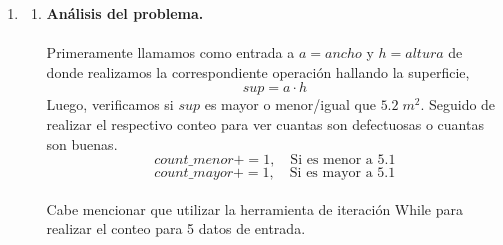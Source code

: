 \begin{enumerate}

\item 
\begin{enumerate}[\bfseries a)]
    
    \item \textbf{Análisis del problema.}\\\\
	Primeramente llamamos como entrada a $a=ancho$  y $h=altura$ de donde realizamos la correspondiente operación hallando la superficie,
	$$sup = a\cdot h$$
	Luego, verificamos si $sup$ es mayor o menor/igual que $5.2\; m^2$. Seguido de  realizar el respectivo conteo para ver cuantas son defectuosas o cuantas son buenas. 
	$$count\_menor += 1, \quad \mbox{Si es menor a 5.1}$$
	$$count\_mayor += 1, \quad \mbox{Si es mayor a 5.1}$$\\
	Cabe mencionar que utilizar la herramienta de iteración While para realizar el conteo para 5 datos de entrada.\\\\
	


\end{enumerate}
\end{enumerate}
